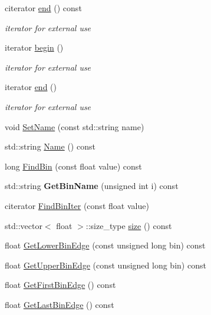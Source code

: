 \begin{DoxyCompactItemize}
\mbox{\label{classQn_1_1Axis_a41d685ea3eb8ed0b3b0cf91228caf819}} 
citerator \mbox{\hyperlink{classQn_1_1Axis_a41d685ea3eb8ed0b3b0cf91228caf819}{end}} () const
\begin{DoxyCompactList}\small\item\em iterator for external use \end{DoxyCompactList}\item 
\mbox{\label{classQn_1_1Axis_a46c31b76eb3c41e25c75c8e540d2d037}} 
iterator \mbox{\hyperlink{classQn_1_1Axis_a46c31b76eb3c41e25c75c8e540d2d037}{begin}} ()
\begin{DoxyCompactList}\small\item\em iterator for external use \end{DoxyCompactList}\item 
\mbox{\label{classQn_1_1Axis_a4d2e34076f1915409a8dae58cce1812f}} 
iterator \mbox{\hyperlink{classQn_1_1Axis_a4d2e34076f1915409a8dae58cce1812f}{end}} ()
\begin{DoxyCompactList}\small\item\em iterator for external use \end{DoxyCompactList}\item 
void \mbox{\hyperlink{classQn_1_1Axis_a80eca8411e7749624fbd146248869fc8}{Set\+Name}} (const std\+::string name)
\item 
std\+::string \mbox{\hyperlink{classQn_1_1Axis_a355ae8809138b8b1017d51d607059ea6}{Name}} () const
\item 
long \mbox{\hyperlink{classQn_1_1Axis_ae2a512dfaf15fbeddfa02c85adb9883f}{Find\+Bin}} (const float value) const
\item 
\mbox{\label{classQn_1_1Axis_af39b2ee7c9ad0bff5bd7069d6b4f3288}} 
std\+::string {\bfseries Get\+Bin\+Name} (unsigned int i) const
\item 
citerator \mbox{\hyperlink{classQn_1_1Axis_a757b881b8615df4ed6d6ba917770b354}{Find\+Bin\+Iter}} (const float value)
\item 
std\+::vector$<$ float $>$\+::size\+\_\+type \mbox{\hyperlink{classQn_1_1Axis_ac3db40c16950698d698f55bcb1c51bf9}{size}} () const
\item 
float \mbox{\hyperlink{classQn_1_1Axis_ac40575006fde015d3b25c7e838e21994}{Get\+Lower\+Bin\+Edge}} (const unsigned long bin) const
\item 
float \mbox{\hyperlink{classQn_1_1Axis_a8ac94e3567fb894439c0a4844c62e4a2}{Get\+Upper\+Bin\+Edge}} (const unsigned long bin) const
\item 
float \mbox{\hyperlink{classQn_1_1Axis_ae9c911292458f9668e689be50614d8dc}{Get\+First\+Bin\+Edge}} () const
\item 
float \mbox{\hyperlink{classQn_1_1Axis_ac363f1585fc08372b81ebba24f2cd38f}{Get\+Last\+Bin\+Edge}} () const
\end{DoxyCompactItemize}


